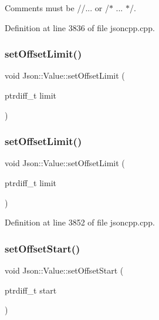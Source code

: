 Comments must be //... or /$\ast$ ... $\ast$/. 



Definition at line 3836 of file jsoncpp.\+cpp.

\hypertarget{class_json_1_1_value_a5e4f5853fec138150c5df6004a8c2bcf}{}\label{class_json_1_1_value_a5e4f5853fec138150c5df6004a8c2bcf} 
\subsubsection{\texorpdfstring{set\+Offset\+Limit()}{setOffsetLimit()}\hspace{0.1cm}{\footnotesize\ttfamily [1/2]}}
{\footnotesize\ttfamily void Json\+::\+Value\+::set\+Offset\+Limit (\begin{DoxyParamCaption}\item[{ptrdiff\+\_\+t}]{limit }\end{DoxyParamCaption})}

\hypertarget{class_json_1_1_value_a5e4f5853fec138150c5df6004a8c2bcf}{}\label{class_json_1_1_value_a5e4f5853fec138150c5df6004a8c2bcf} 
\subsubsection{\texorpdfstring{set\+Offset\+Limit()}{setOffsetLimit()}\hspace{0.1cm}{\footnotesize\ttfamily [2/2]}}
{\footnotesize\ttfamily void Json\+::\+Value\+::set\+Offset\+Limit (\begin{DoxyParamCaption}\item[{ptrdiff\+\_\+t}]{limit }\end{DoxyParamCaption})}



Definition at line 3852 of file jsoncpp.\+cpp.

\hypertarget{class_json_1_1_value_a92e32ea0f4f8a15853a3cf0beac9feb9}{}\label{class_json_1_1_value_a92e32ea0f4f8a15853a3cf0beac9feb9} 
\subsubsection{\texorpdfstring{set\+Offset\+Start()}{setOffsetStart()}\hspace{0.1cm}{\footnotesize\ttfamily [1/2]}}
{\footnotesize\ttfamily void Json\+::\+Value\+::set\+Offset\+Start (\begin{DoxyParamCaption}\item[{ptrdiff\+\_\+t}]{start }\end{DoxyParamCaption})}

